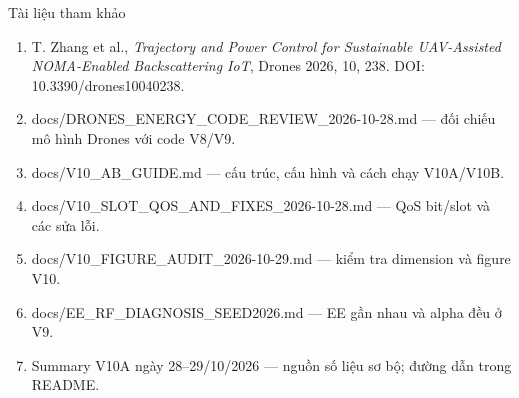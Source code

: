 \documentclass[t,aspectratio=169]{beamer}
\newcommand{\code}[1]{{\small\ttfamily #1}}
\begin{document}
\begin{frame}{Tài liệu tham khảo}
  \scriptsize
  \begin{enumerate}
    \item T. Zhang et al., \emph{Trajectory and Power Control for Sustainable UAV-Assisted NOMA-Enabled Backscattering IoT}, Drones 2026, 10, 238. DOI: 10.3390/drones10040238.
    \item \code{docs/DRONES\_ENERGY\_CODE\_REVIEW\_2026-10-28.md} --- đối chiếu mô hình Drones với code V8/V9.
    \item \code{docs/V10\_AB\_GUIDE.md} --- cấu trúc, cấu hình và cách chạy V10A/V10B.
    \item \code{docs/V10\_SLOT\_QOS\_AND\_FIXES\_2026-10-28.md} --- QoS bit/slot và các sửa lỗi.
    \item \code{docs/V10\_FIGURE\_AUDIT\_2026-10-29.md} --- kiểm tra dimension và figure V10.
    \item \code{docs/EE\_RF\_DIAGNOSIS\_SEED2026.md} --- EE gần nhau và alpha đều ở V9.
    \item Summary V10A ngày 28--29/10/2026 --- nguồn số liệu sơ bộ; đường dẫn trong README.
  \end{enumerate}
\end{frame}

\hustthankyou
\end{document}
